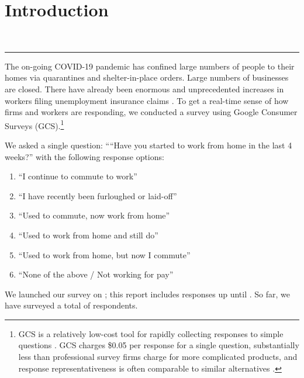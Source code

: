 \documentclass[12pt]{article}
\newcommand{\covid}{COVID-19}
\begin{document}
\section{Introduction}
   \\
   \newline
   \newline
  {\color{red} \rule{\linewidth}{0.5mm}}

The on-going \covid{} pandemic has confined large numbers of people to their homes via quarantines and shelter-in-place orders.
Large numbers of businesses are closed. 
There have already been enormous and unprecedented increases in workers filing unemployment insurance claims \citep{goldsmith2020}. 
To get a real-time sense of how firms and workers are responding, we conducted a survey using Google Consumer Surveys (GCS).\footnote{
GCS is a relatively low-cost tool for rapidly collecting responses to simple questions \cite{stephens2014hands}. 
GCS charges \$0.05 per response for a single question, substantially less than professional survey firms charge for more complicated products, and response representativeness is often comparable to similar alternatives \citep{santoso2016survey, brynjolfsson2019using}.
}

We asked a single question:
````Have you started to work from home in the last 4 weeks?''
with the following response options: 
\begin{enumerate} 
\item ``I continue to commute to work''
\item ``I have recently been furloughed or laid-off''
\item ``Used to commute, now work from home''   
\item ``Used to work from home and still do''       
\item ``Used to work from home, but now I commute''
\item ``None of the above / Not working for pay''
\end{enumerate} 

We launched our survey on \SurveyStart{}; this report includes responses up until \SurveyEnd{}. 
So far, we have surveyed a total of \numObs{} respondents.
\end{document}
